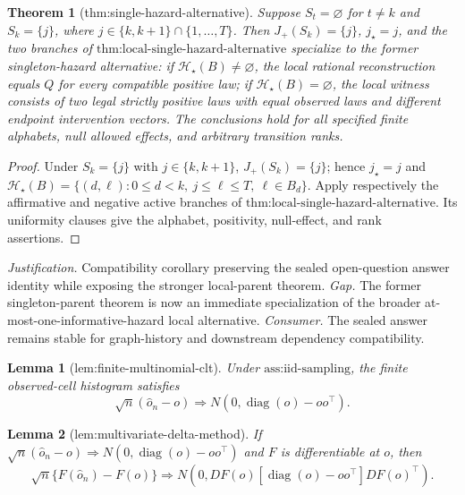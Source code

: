 \documentclass{article}
\newtheorem{theorem}{Theorem}
\newtheorem{lemma}{Lemma}
\begin{document}
\begin{theorem}[thm:single-hazard-alternative]\label{thm:single-hazard-alternative}
Suppose \(S_t=\varnothing\) for \(t\ne k\) and \(S_k=\{j\}\), where \(j\in\{k,k+1\}\cap\{1,\ldots,T\}\). Then \(J_+(S_k)=\{j\}\), \(j_\star=j\), and the two branches of \(\text{thm:local-single-hazard-alternative}\) specialize to the former singleton-hazard alternative: if \(\mathcal H_\star(B)\ne\varnothing\), the local rational reconstruction equals \(Q\) for every compatible positive law; if \(\mathcal H_\star(B)=\varnothing\), the local witness consists of two legal strictly positive laws with equal observed laws and different endpoint intervention vectors. The conclusions hold for all specified finite alphabets, null allowed effects, and arbitrary transition ranks.
\end{theorem}
\begin{proof}
Under \(S_k=\{j\}\) with \(j\in\{k,k+1\}\), \(J_+(S_k)=\{j\}\); hence \(j_\star=j\) and \(\mathcal H_\star(B)=\{(d,\ell):0\le d<k,\ j\le\ell\le T,\ \ell\in B_d\}\). Apply respectively the affirmative and negative active branches of \(\text{thm:local-single-hazard-alternative}\). Its uniformity clauses give the alphabet, positivity, null-effect, and rank assertions.
\end{proof}
\par\smallskip\noindent \textit{Justification.} Compatibility corollary preserving the sealed open-question answer identity while exposing the stronger local-parent theorem. \textit{Gap.} The former singleton-parent theorem is now an immediate specialization of the broader at-most-one-informative-hazard local alternative. \textit{Consumer.} The sealed answer remains stable for graph-history and downstream dependency compatibility.

\begin{lemma}[lem:finite-multinomial-clt]\label{lem:finite-multinomial-clt}
Under \(\text{ass:iid-sampling}\), the finite observed-cell histogram satisfies \[\sqrt n(\widehat o_n-o)\Rightarrow N(0,\operatorname{diag}(o)-oo^\top).\]
\end{lemma}

\begin{lemma}[lem:multivariate-delta-method]\label{lem:multivariate-delta-method}
If \(\sqrt n(\widehat o_n-o)\Rightarrow N(0,\operatorname{diag}(o)-oo^\top)\) and \(F\) is differentiable at \(o\), then \[\sqrt n\{F(\widehat o_n)-F(o)\}\Rightarrow N\!\left(0,DF(o)[\operatorname{diag}(o)-oo^\top]DF(o)^\top\right).\]
\end{lemma}
\end{document}
